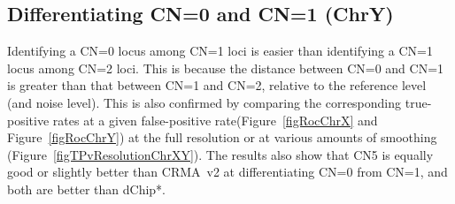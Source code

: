 \documentclass{bioinfo}
\newcommand{\TPrates}{true-positive rates\xspace}
\newcommand{\FPrate}{false-positive rate\xspace}
\begin{document}
\subsection{Differentiating CN=0 and CN=1 (ChrY)}
Identifying a CN=0 locus among CN=1 loci is easier than identifying a CN=1 locus among CN=2 loci.  
This is because the distance between CN=0 and CN=1 is greater than that between CN=1 and CN=2, relative to the reference level (and noise level). 
This is also confirmed by comparing the corresponding \TPrates at a given \FPrate (Figure~\ref{figRocChrX} and Figure~\ref{figRocChrY}) at the full resolution or at various amounts of smoothing (Figure~\ref{figTPvResolutionChrXY}).  
The results also show that CN5 is equally good or slightly better than CRMA~v2 at differentiating CN=0 from CN=1, and both are better than dChip*.
\end{document}
